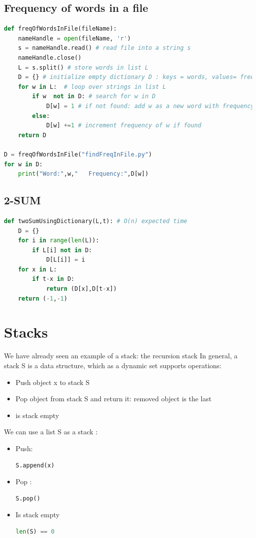 \documentclass[12pt,oneside]{book}
\begin{document}
\subsection{Frequency of words in a file}
{\small\begin{lstlisting}[language=python]
def freqOfWordsInFile(fileName):
    nameHandle = open(fileName, 'r')
    s = nameHandle.read() # read file into a string s
    nameHandle.close()
    L = s.split() # store words in list L
    D = {} # initialize empty dictionary D : keys = words, values= frequencies  
    for w in L:  # loop over strings in list L 
        if w  not in D: # search for w in D
            D[w] = 1 # if not found: add w as a new word with frequency  1  
        else: 
            D[w] +=1 # increment frequency of w if found 
    return D

D = freqOfWordsInFile("findFreqInFile.py")
for w in D:
    print("Word:",w,"   Frequency:",D[w])
\end{lstlisting}}
\subsection{2-SUM}
{\small\begin{lstlisting}[language=python]
def twoSumUsingDictionary(L,t): # O(n) expected time 
    D = {}
    for i in range(len(L)):
        if L[i] not in D: 
            D[L[i]] = i
    for x in L:
        if t-x in D: 
            return (D[x],D[t-x])
    return (-1,-1)
\end{lstlisting}}
\section{Stacks}
We have already seen an example of a stack: the recursion stack
In general, a stack S is a data structure, which as a dynamic set supports operations:
\begin{itemize}
	\item Push object x to stack S
	\item Pop object from stack S and return it: removed object is the last
	\item is stack empty
\end{itemize}
We can use a list S as a stack :
\begin{itemize}
	\item Push: \begin{lstlisting}[language=python]
S.append(x)
\end{lstlisting}
	\item Pop : \begin{lstlisting}[language=python]
S.pop()
\end{lstlisting}
	\item Is stack empty \begin{lstlisting}[language=python]
len(S) == 0
\end{lstlisting}
\end{itemize}
\end{document}
